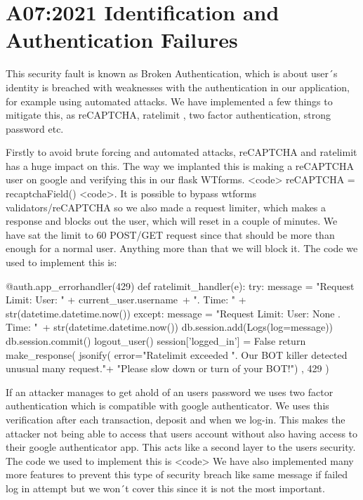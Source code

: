 \section{A07:2021 Identification and Authentication Failures}

This security fault is known as Broken Authentication, which is about user´s identity is breached with weaknesses with the authentication in our application, for example using automated attacks. We have implemented a few things to mitigate this, as reCAPTCHA, ratelimit , two factor authentication, strong password etc.   

Firstly to avoid brute forcing and automated attacks, reCAPTCHA and ratelimit has a huge impact on this. The way we implanted this is making a reCAPTCHA user on google and verifying this in our flask WTforms. <code> reCAPTCHA = recaptchaField() <code>. It is possible to bypass wtforms validators/reCAPTCHA so we also made a request limiter, which makes a response and blocks out the user, which will reset in a couple of minutes. We have sat the limit to 60 POST/GET request since that should be more than enough for a normal user. Anything more than that we will block it. The code we used to implement this is:

\begin{python}
@auth.app_errorhandler(429)
def ratelimit_handler(e):
    try:
        message = "Request Limit: User: " + current_user.username\
                  + ". Time: " + str(datetime.datetime.now())
    except:
        message = "Request Limit: User: None . Time: "\
                  + str(datetime.datetime.now())
    db.session.add(Logs(log=message))
    db.session.commit()
    logout_user()
    session['logged_in'] = False
    return make_response(
        jsonify(
            error="Ratelimit exceeded %
                  ". Our BOT killer detected unusual many request."+
                  "Please slow down or turn of your BOT!")
        , 429
    )
\end{python}

If an attacker manages to get ahold of an users password we uses two factor authentication which is compatible with google authenticator. We uses this verification after each transaction, deposit and when we log-in. This makes the attacker not being able to access that users account without also having access to their google authenticator app. This acts like a second layer to the users security.  The code we used to implement this is <code>
We have also implemented many more features to prevent this type of security breach like same message if failed log in attempt but we won´t cover this since it is not the most important. 


